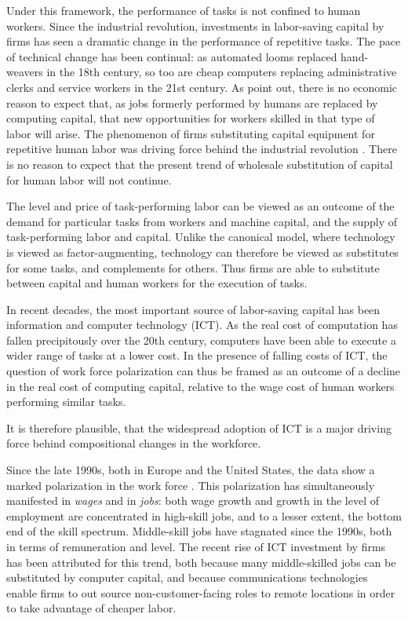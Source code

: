 Under this framework, the performance of tasks is not confined to human workers. Since the industrial revolution, investments in labor-saving capital by firms has seen a dramatic change in the performance of repetitive tasks. The pace of technical change has been continual: as automated looms replaced hand-weavers in the 18th century, so too are cheap computers replacing administrative clerks and service workers in the 21st century. As \citet{Brynjolfsson2011} point out, there is no economic reason to expect that, as jobs formerly performed by humans are replaced by computing capital, that new opportunities for workers skilled in that type of labor will arise. The phenomenon of firms substituting capital equipment for repetitive human labor was driving force behind the industrial revolution \citet{Goldin1998}. There is no reason to expect that the present trend of wholesale substitution of capital for human labor will not continue.

The level and price of task-performing labor can be viewed as an outcome of the demand for particular tasks from workers and machine capital, and the supply of task-performing labor and capital. Unlike the canonical model, where technology is viewed as factor-augmenting,  technology can therefore be viewed as substitutes for some tasks, and complements for others. Thus firms are able to substitute between capital and human workers for the execution of tasks.

In recent decades, the most important source of labor-saving capital has been information and computer technology (ICT). As the real cost of computation has fallen precipitously over the 20th century, computers have been able to execute a wider range of tasks at a lower cost. In the presence of falling costs of ICT, the question of work force polarization can thus be framed as an outcome of a decline in the real cost of computing capital, relative to the wage cost of human workers performing similar tasks.

It is therefore plausible, that the widespread adoption of ICT is a major driving force behind compositional changes in the workforce. 

Since the late 1990s, both in Europe and the United States, the data show a marked polarization in the work force \citep{Goos2007, Autor2006}. This polarization has simultaneously manifested in \emph{wages} and in \emph{jobs}: both wage growth and growth in the level of employment are concentrated in high-skill jobs, and to a lesser extent, the bottom end of the skill spectrum. Middle-skill jobs have stagnated since the 1990s, both in terms of remuneration and level. The recent rise of ICT investment by firms has been attributed for this trend, both because many middle-skilled jobs can be substituted by computer capital, and because communications technologies enable firms to out source non-customer-facing roles to remote locations in order to take advantage of cheaper labor.

